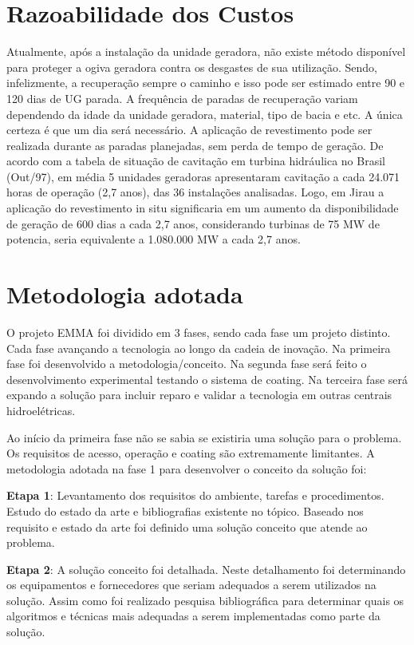 \section{Razoabilidade dos Custos}

Atualmente, após a instalação da unidade geradora, não existe método disponível
para proteger a ogiva geradora contra os desgastes de sua utilização. Sendo,
infelizmente, a recuperação sempre o caminho e isso pode ser estimado entre 90 e
120 dias de UG parada. A frequência de paradas de recuperação variam dependendo
da idade da unidade geradora, material, tipo de bacia e etc. A única certeza é
que um dia será necessário. A aplicação de revestimento pode ser realizada
durante as paradas planejadas, sem perda de tempo de geração.
De acordo com a tabela de situação de cavitação em turbina hidráulica no Brasil
(Out/97), em média 5 unidades geradoras apresentaram  cavitação a cada 24.071
horas de operação (2,7 anos), das 36 instalações analisadas. Logo, em Jirau a
aplicação do revestimento in situ significaria em um aumento da disponibilidade
de geração de 600 dias a cada 2,7 anos, considerando turbinas de 75 MW de
potencia, seria equivalente a 1.080.000 MW a cada 2,7 anos.

\section{Metodologia adotada}

O projeto EMMA foi dividido em 3 fases, sendo cada fase um projeto distinto.
Cada fase avançando a tecnologia ao longo da cadeia de inovação. Na primeira
fase foi desenvolvido a metodologia/conceito. Na segunda fase será feito o
desenvolvimento experimental testando o sistema de coating. Na terceira fase
será expando a solução para incluir reparo e validar a tecnologia em outras
centrais hidroelétricas.

Ao início da primeira fase não se sabia se existiria uma solução para o
problema. Os requisitos de acesso, operação e coating são extremamente
limitantes. A metodologia adotada na fase 1 para desenvolver o conceito da
solução foi:

\textbf{Etapa 1}: Levantamento dos requisitos do ambiente, tarefas e
procedimentos.
Estudo do estado da arte e bibliografias existente no tópico. Baseado nos
requisito e estado da arte foi definido uma solução conceito que atende ao problema.

\textbf{Etapa 2}: A solução conceito foi detalhada. Neste detalhamento foi
determinando os equipamentos e fornecedores que seriam adequados a serem
utilizados na solução. Assim como foi realizado pesquisa bibliográfica para
determinar quais os algoritmos e técnicas mais adequadas a serem implementadas
como parte da solução.

